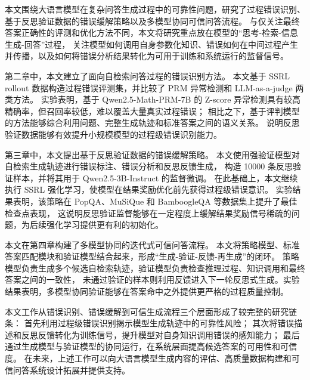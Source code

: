 \begin{conclusions}

本文围绕大语言模型在复杂问答生成过程中的可靠性问题，研究了过程错误识别、基于反思验证数据的错误缓解策略以及多模型协同可信问答流程。
与仅关注最终答案正确性的评测和优化方法不同，本文将研究重点放在模型的“思考-检索-信息生成-回答”过程，
关注模型如何调用自身参数化知识、错误如何在中间过程产生并传播，以及如何将错误分析结果转化为可用于训练和系统运行的监督信号。

第二章中，本文建立了面向自检索问答过程的错误识别方法。
本文基于 SSRL rollout 数据构造过程错误评测集，并比较了 PRM 异常检测和 LLM-as-a-judge 两类方法。
实验表明，基于 Qwen2.5-Math-PRM-7B 的 Z-score 异常检测具有较高精确率，但召回率较低，难以覆盖大量真实过程错误；
相比之下，基于评判模型的方法能够综合利用问题、完整生成轨迹和标准答案之间的语义关系。
说明反思验证数据能够有效提升小规模模型的过程级错误识别能力。

第三章中，本文提出基于反思验证数据的错误缓解策略。
本文使用强验证模型对自检索生成轨迹进行错误标注、错误分析和反思反馈生成，
构造 10000 条反思验证样本，并将其用于 Qwen2.5-3B-Instruct 的监督微调。
在此基础上，本文继续执行 SSRL 强化学习，使模型在结果奖励优化前先获得过程级错误意识。
实验结果表明，该策略在 PopQA、MuSiQue 和 BamboogleQA 等数据集上提升了最佳检查点表现，
这说明反思验证监督能够在一定程度上缓解结果奖励信号稀疏的问题，为后续强化学习提供更有利的初始化。

本文在第四章构建了多模型协同的迭代式可信问答流程。
本文将策略模型、标准答案匹配模块和验证模型结合起来，形成“生成-验证-反馈-再生成”的闭环。
策略模型负责生成多个候选自检索轨迹，验证模型负责检查推理过程、知识调用和最终答案之间的一致性，
未通过验证的样本则利用反馈进入下一轮反思式生成。实验结果表明，多模型协同验证能够在答案命中之外提供更严格的过程质量控制。

本文工作从错误识别、错误缓解到可信生成流程三个层面形成了较完整的研究链条：
首先利用过程级错误识别揭示模型生成轨迹中的可靠性风险；
其次将错误描述和反思反馈转化为训练信号，提升模型对自身知识调用错误的感知能力；
最后通过生成模型与验证模型的协同运行，在系统层面提高候选答案的可用性和可信度。
在未来，上述工作可以向大语言模型生成内容的评估、高质量数据构建和可信问答系统设计拓展并提供支持。



\end{conclusions}
